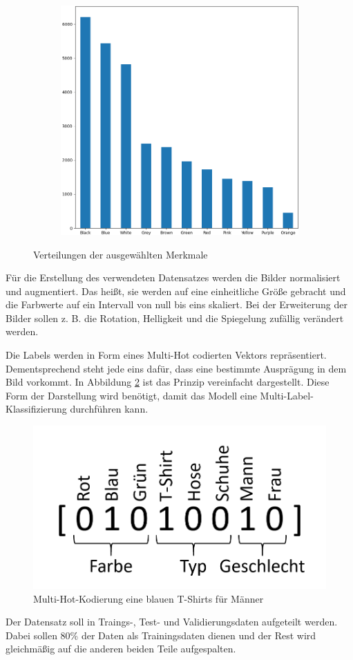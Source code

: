 \begin{figure}[H]
\begin{subfigure}[c]{0.32\linewidth}
    \end{subfigure}
    \begin{subfigure}[c]{0.32\linewidth}
        \includegraphics[width=\linewidth]{images/baseColour.png}
    \end{subfigure}
    \caption{Verteilungen der ausgewählten Merkmale}
    \label{fig:evaluation}
\end{figure}

Für die Erstellung des verwendeten Datensatzes werden die Bilder normalisiert und augmentiert. Das heißt, sie werden auf eine einheitliche Größe gebracht und die Farbwerte auf ein Intervall von null bis eins skaliert. Bei der Erweiterung der Bilder sollen z. B. die Rotation, Helligkeit und die Spiegelung zufällig verändert werden.

Die Labels werden in Form eines Multi-Hot codierten Vektors repräsentiert. Dementsprechend steht jede eins dafür, dass eine bestimmte Ausprägung in dem Bild vorkommt. In Abbildung \ref{fig:multihot} ist das Prinzip vereinfacht dargestellt. Diese Form der Darstellung wird benötigt, damit das Modell eine Multi-Label-Klassifizierung durchführen kann.

\begin{figure}[H]
    \centering
    \includegraphics[width=0.3\linewidth]{images/MultiHotEncoding.png}
    \caption{Multi-Hot-Kodierung eine blauen T-Shirts für Männer}
    \label{fig:multihot}
\end{figure}

Der Datensatz soll in Traings-, Test- und Validierungsdaten aufgeteilt werden. Dabei sollen 80\% der Daten als Trainingsdaten dienen und der Rest wird gleichmäßig auf die anderen beiden Teile aufgespalten.